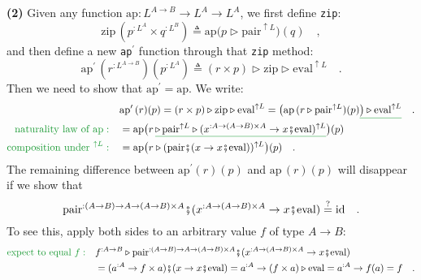 \textbf{(2)} Given any function $\text{ap}:L^{A\rightarrow B}\rightarrow L^{A}\rightarrow L^{A}$,
we first define \lstinline!zip!:
\[
\text{zip}\,(p^{:L^{A}}\times q^{:L^{B}})\triangleq\text{ap}\big(p\triangleright\text{pair}^{\uparrow L}\big)(q)\quad,
\]
and then define a new \lstinline!ap!$^{\prime}$ function through
that \lstinline!zip! method:
\[
\text{ap}^{\prime}\,(r^{:L^{A\rightarrow B}})(p^{:L^{A}})\triangleq(r\times p)\triangleright\text{zip}\triangleright\text{eval}^{\uparrow L}\quad.
\]
Then we need to show that $\text{ap}^{\prime}=\text{ap}$. We write:
\begin{align*}
 & \text{ap}^{\prime}\,(r)(p)=(r\times p)\triangleright\text{zip}\triangleright\text{eval}^{\uparrow L}=\big(\text{ap}\,(r\triangleright\text{pair}^{\uparrow L})(p)\gunderline{\big)\triangleright\text{eval}^{\uparrow L}}\quad.\\
{\color{greenunder}\text{naturality law of }\text{ap}:}\quad & =\text{ap}\big(r\,\gunderline{\triangleright\,\text{pair}^{\uparrow L}\triangleright(x^{:A\rightarrow\left(A\rightarrow B\right)\times A}\rightarrow x\bef\text{eval})^{\uparrow L}}\big)(p)\\
{\color{greenunder}\text{composition under }^{\uparrow L}:}\quad & =\text{ap}\big(r\triangleright(\text{pair}\bef(x\rightarrow x\bef\text{eval}))^{\uparrow L}\big)(p)\quad.
\end{align*}
The remaining difference between $\text{ap}^{\prime}(r)(p)$ and $\text{ap}\,(r)(p)$
will disappear if we show that 
\[
\text{pair}^{:\left(A\rightarrow B\right)\rightarrow A\rightarrow\left(A\rightarrow B\right)\times A}\bef(x^{:A\rightarrow\left(A\rightarrow B\right)\times A}\rightarrow x\bef\text{eval})\overset{?}{=}\text{id}\quad.
\]
To see this, apply both sides to an arbitrary value $f$ of type $A\rightarrow B$:
\begin{align*}
{\color{greenunder}\text{expect to equal }f:}\quad & f^{:A\rightarrow B}\triangleright\text{pair}^{:\left(A\rightarrow B\right)\rightarrow A\rightarrow\left(A\rightarrow B\right)\times A}\bef(x^{:A\rightarrow\left(A\rightarrow B\right)\times A}\rightarrow x\bef\text{eval})\\
 & =(a^{:A}\rightarrow f\times a)\bef(x\rightarrow x\bef\text{eval})=a^{:A}\rightarrow(f\times a)\triangleright\text{eval}=a^{:A}\rightarrow f(a)=f\quad.
\end{align*}

